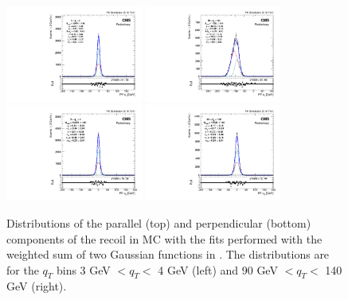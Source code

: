 \begin{figure}
\begin{center}
\includegraphics[width=0.4\textwidth]{Figures/WBoson/Analysis/Correction/Recoil/RecoilFits/MC/pfu1fit_2.pdf}
\includegraphics[width=0.4\textwidth]{Figures/WBoson/Analysis/Correction/Recoil/RecoilFits/MC/pfu1fit_29.pdf} \\
\includegraphics[width=0.4\textwidth]{Figures/WBoson/Analysis/Correction/Recoil/RecoilFits/MC/pfu2fit_2.pdf}
\includegraphics[width=0.4\textwidth]{Figures/WBoson/Analysis/Correction/Recoil/RecoilFits/MC/pfu2fit_29.pdf}
\caption{Distributions of the parallel (top) and perpendicular (bottom) components of the recoil in MC with the fits performed with the weighted sum of two Gaussian functions in . The distributions are for the $q_{T}$
bins 3 GeV $< q_{T} <$ 4 GeV (left) and 90 GeV $< q_{T} <$ 140 GeV (right).}
\label{fig:RecoilFitsMC}
\end{center}
\end{figure}
 
